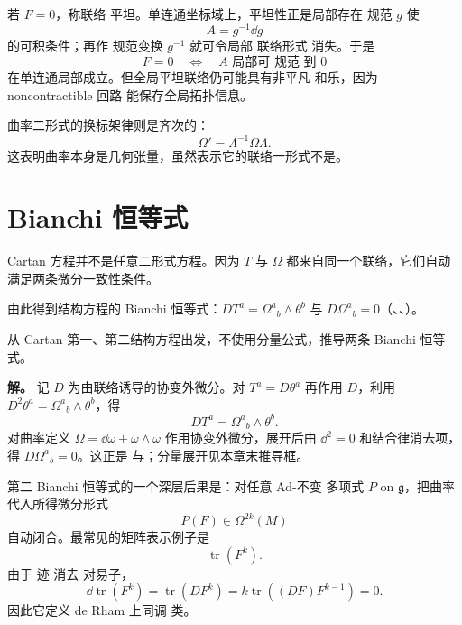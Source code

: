 若 $F=0$，称联络 平坦。单连通坐标域上，平坦性正是局部存在 规范 $g$ 使
\begin{equation*}A=g^{-1}\dd g\end{equation*}
的可积条件；再作 规范变换 $g^{-1}$ 就可令局部 联络形式 消失。于是
\[
F=0
\quad\Longleftrightarrow\quad
A\text{ 局部可 规范 到 }0
\]
在单连通局部成立。但全局平坦联络仍可能具有非平凡 和乐，因为 noncontractible 回路 能保存全局拓扑信息。

曲率二形式的换标架律则是齐次的：
\begin{equation*}\Omega'=\Lambda^{-1}\Omega\Lambda.
\end{equation*}
这表明曲率本身是几何张量，虽然表示它的联络一形式不是。

\section{Bianchi 恒等式}
Cartan 方程并不是任意二形式方程。因为 $T$ 与 $\Omega$ 都来自同一个联络，它们自动满足两条微分一致性条件。

由此得到结构方程的 Bianchi 恒等式：$DT^a=\Omega^a{}_b\wedge\theta^b$ 与 $D\Omega^a{}_b=0$（、、）。

\par
\begin{workedexample}
从 Cartan 第一、第二结构方程出发，不使用分量公式，推导两条 Bianchi 恒等式。

\textbf{解。} 记 \(D\) 为由联络诱导的协变外微分。对 \(T^a=D\theta^a\) 再作用 \(D\)，利用 \(D^2\theta^a=\Omega^a{}_b\wedge\theta^b\)，得
\[
DT^a=\Omega^a{}_b\wedge\theta^b.
\]
对曲率定义 \(\Omega=\dd\omega+\omega\wedge\omega\) 作用协变外微分，展开后由 \(\dd^2=0\) 和结合律消去项，得 \(D\Omega^a{}_b=0\)。这正是 与；分量展开见本章末推导框。
\end{workedexample}
\par


第二 Bianchi 恒等式的一个深层后果是：对任意 Ad-不变 多项式 $P$ on $\mathfrak g$，把曲率代入所得微分形式
\begin{equation*}P(F)\in\Omega^{2k}(M)\end{equation*}
自动闭合。最常见的矩阵表示例子是
\[
\operatorname{tr}(F^k).
\]
由于 迹 消去 对易子，
\[
\dd\operatorname{tr}(F^k)
=\operatorname{tr}(D F^k)
=k\operatorname{tr}((DF)F^{k-1})=0.
\]
因此它定义 de Rham 上同调 类。


